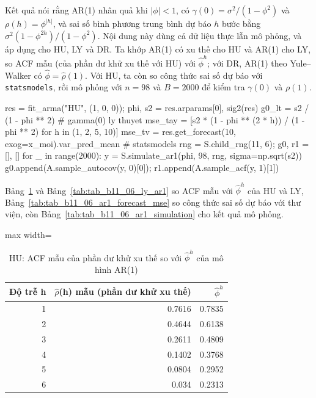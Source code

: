  Kết quả  nói rằng AR(1) nhân quả khi $|\phi|<1$, có $\gamma(0)=\sigma^2/(1-\phi^2)$ và $\rho(h)=\phi^{|h|}$, và sai số bình phương trung bình dự báo $h$ bước bằng $\sigma^2(1-\phi^{2h})/(1-\phi^2)$.
 Nội dung này dùng cả dữ liệu thực lẫn mô phỏng, và áp dụng cho HU, LY và DR. Ta khớp AR(1) có xu thế cho HU và AR(1) cho LY, so ACF mẫu (của phần dư khử xu thế với HU) với $\hat\phi^h$; với DR, AR(1) theo Yule--Walker có $\hat\phi=\hat\rho(1)$. Với HU, ta còn so công thức sai số dự báo với \texttt{statsmodels}, rồi mô phỏng với $n=98$ và $B=2000$ để kiểm tra $\gamma(0)$ và $\rho(1)$.
\begin{codeblock}
res = fit_arma("HU", (1, 0, 0)); phi, s2 = res.arparams[0], sig2(res)
g0_lt = s2 / (1 - phi ** 2)                                   # gamma(0) ly thuyet
mse_tay = [s2 * (1 - phi ** (2 * h)) / (1 - phi ** 2) for h in (1, 2, 5, 10)]
mse_tv = res.get_forecast(10, exog=x_moi).var_pred_mean       # statsmodels
rng = S.child_rng(11, 6); g0, r1 = [], []
for _ in range(2000):
    y = S.simulate_ar1(phi, 98, rng, sigma=np.sqrt(s2))
    g0.append(A.sample_autocov(y, 0)[0]); r1.append(A.sample_acf(y, 1)[1])
\end{codeblock}
 Bảng~\ref{tab:tab_b11_06_ar1_acf} và Bảng~\ref{tab:tab_b11_06_ly_ar1} so ACF mẫu với $\hat\phi^h$ của HU và LY, Bảng~\ref{tab:tab_b11_06_ar1_forecast_mse} so công thức sai số dự báo với thư viện, còn Bảng~\ref{tab:tab_b11_06_ar1_simulation} cho kết quả mô phỏng.
\begin{table}[H]
\centering\footnotesize
\caption{HU: ACF mẫu của phần dư khử xu thế so với $\hat\phi^h$ của mô hình AR(1)}\label{tab:tab_b11_06_ar1_acf}
\begin{adjustbox}{max width=\linewidth}
\begin{tabular}{|r|r|r|}
\toprule
Độ trễ h & $\hat{\rho}$(h) mẫu (phần dư khử xu thế) & $\hat{\phi}^{h}$ \\
\midrule
1 & 0.7616 & 0.7835 \\
2 & 0.4644 & 0.6138 \\
3 & 0.2611 & 0.4809 \\
4 & 0.1402 & 0.3768 \\
5 & 0.0804 & 0.2952 \\
6 & 0.034 & 0.2313 \\
\bottomrule
\end{tabular}
\end{adjustbox}
\end{table}

